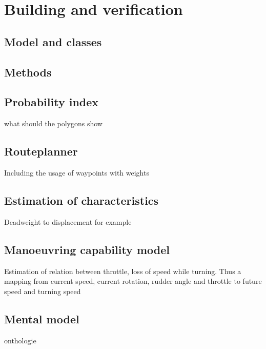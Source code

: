 \chapter{Building and verification}

\section{Model and classes}

\section{Methods}

\section{Probability index}
what should the polygons show

\section{Routeplanner}
Including the usage of waypoints with weights

\section{Estimation of characteristics}
Deadweight to displacement for example

\section{Manoeuvring capability model}
Estimation of relation between throttle, loss of speed while turning. Thus a mapping from current speed, current rotation, rudder angle and throttle to future speed and turning speed

\section{Mental model}
onthologie
